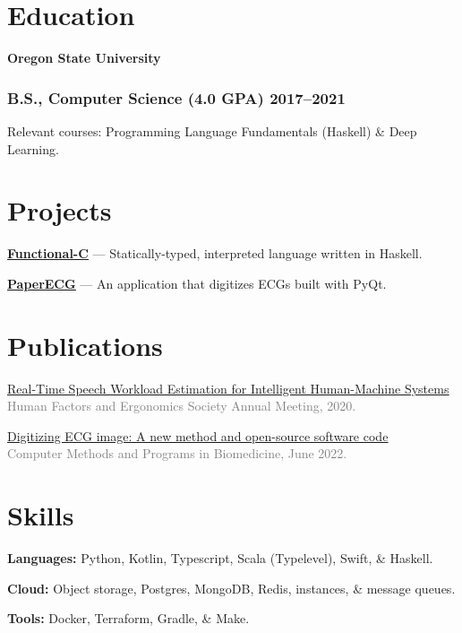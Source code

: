 \documentclass[10pt]{article} %
\let\defaultref\href
\renewcommand{\href}[2]{%
  \defaultref{#1}{\ul{#2}}%
}
\renewcommand{\emph}[1]{%
  \textcolor{gray}{#1}%
}
\begin{document}
\begin{paracol}{2}
\raggedright

\hypertarget{education}{%
\section{Education}\label{education}}

\textbf{Oregon State University}

\hypertarget{b.s.-computer-science-4.0-gpa-20172021}{%
\subsubsection{B.S., Computer Science (4.0 GPA)
2017--2021}\label{b.s.-computer-science-4.0-gpa-20172021}}

Relevant courses: Programming Language Fundamentals (Haskell) \& Deep
Learning.

\hypertarget{projects}{%
\section{Projects}\label{projects}}

\textbf{\href{https://github.com/julianfortune/CS381Project}{Functional-C}}
--- Statically-typed, interpreted language written in Haskell.

\textbf{\href{https://github.com/Tereshchenkolab/paper-ecg}{PaperECG}}
--- An application that digitizes ECGs built with PyQt.

\hypertarget{publications}{%
\section{Publications}\label{publications}}

\vspace{1pt}

\href{https://doi.org/10.1177/1071181320641076}{Real-Time Speech
Workload Estimation for Intelligent Human-Machine Systems}\\
\emph{Human Factors and Ergonomics Society Annual Meeting, 2020.}

\href{https://doi.org/10.1101/2021.07.13.21260461}{Digitizing ECG image:
A new method and open-source software code}\\
\emph{Computer Methods and Programs in Biomedicine, June 2022.}

\hypertarget{skills}{%
\section{Skills}\label{skills}}

\textbf{Languages:} Python, Kotlin, Typescript, Scala (Typelevel),
Swift, \& Haskell.

\textbf{Cloud:} Object storage, Postgres, MongoDB, Redis, instances, \&
message queues.

\textbf{Tools:} Docker, Terraform, Gradle, \& Make.

\end{paracol}

\end{document}
